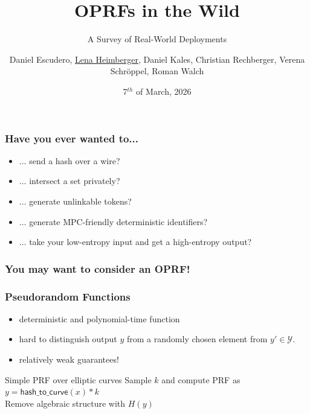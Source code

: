 \documentclass[10pt]{beamer}
\title{OPRFs in the Wild}
\subtitle{A Survey of Real-World Deployments}
\date{7$^{th}$ of March, 2026}
\author{Daniel Escudero, \underline{Lena Heimberger}, Daniel Kales, Christian
Rechberger, Verena Schröppel, Roman Walch}
\institute{RWMPC 2026, Taipei}
\begin{document}
\maketitle

\begin{frame}
  \frametitle{Have you ever wanted to...}
  \begin{itemize}
    \item $\ldots$ send a hash over a wire?\pause
    \item $\ldots$ intersect a set privately?\pause
    \item $\ldots$ generate unlinkable tokens?\pause
    \item $\ldots$ generate MPC-friendly deterministic identifiers?\pause
    \item $\ldots$ take your low-entropy input and get a high-entropy output?
  \end{itemize}

\end{frame}


\begin{frame}
  \frametitle{You may want to consider an OPRF!}
\end{frame}


\begin{frame}
  \frametitle{Pseudorandom Functions \cite{C:GolGolMic84,GolGolMic86} }
  \begin{itemize}
    \item deterministic and polynomial-time function 
    \item hard to distinguish output $y$ from a randomly chosen element from
      $y'\in\mathcal{Y}$.
    \item relatively weak guarantees!
  \end{itemize}\pause
  \bigskip
  \begin{exampleblock}{Simple PRF over elliptic curves}
    Sample $k$ and compute PRF as $y=\mathsf{hash\_to\_curve}(x)*k$\\ Remove algebraic structure with
    $H(y)$
  \end{exampleblock}
\end{frame}
\end{document}
